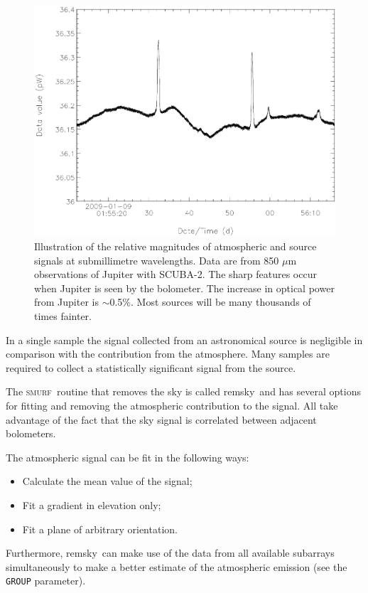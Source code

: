 \documentclass[twoside,11pt]{article}
\newcommand{\xref}[3]{#1}
\renewcommand{\_}{\texttt{\symbol{95}}}
\newcommand{\SMURF}{\textsc{smurf}}
\newcommand{\task}[1]{\textsf{#1}}
\newcommand{\remsky}{\xref{\task{remsky}}{sun258}{REMSKY}}
\newcommand{\aparam}[1]{\texttt{#1}}     %
\begin{document}
\begin{figure}[htb]
  \begin{center}
    \includegraphics[width=150mm]{sun258_submmsignal}
    \caption{Illustration of the relative magnitudes of atmospheric
      and source signals at submillimetre wavelengths. Data are from
      850 $\mu$m observations of Jupiter with SCUBA-2. The sharp
      features occur when Jupiter is seen by the bolometer. The
      increase in optical power from Jupiter is $\sim$0.5\%. Most
      sources will be many thousands of times fainter.}
    \label{fig:signal}
  \end{center}
\end{figure}

In a single sample the signal collected from an astronomical source is
negligible in comparison with the contribution from the
atmosphere. Many samples are required to collect a statistically
significant signal from the source.

The \SMURF\ routine that removes the sky is called \remsky\ and has
several options for fitting and removing the atmospheric contribution
to the signal. All take advantage of the fact that the sky signal is
correlated between adjacent bolometers.

The atmospheric signal can be fit in the following ways:
\begin{itemize}
\item Calculate the mean value of the signal;
\item Fit a gradient in elevation only;
\item Fit a plane of arbitrary orientation.
\end{itemize}
Furthermore, \remsky\ can make use of the data from all available
subarrays simultaneously to make a better estimate of the atmospheric
emission (see the \aparam{GROUP} parameter).
\end{document}
